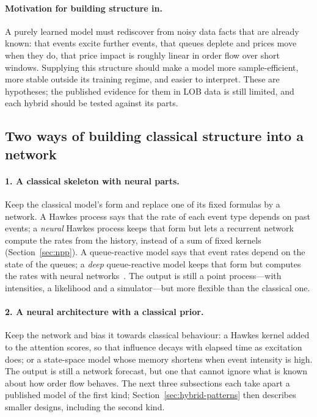 \paragraph{Motivation for building structure in.} A purely learned model must rediscover from noisy
data facts that are already known: that events excite further events, that queues deplete and prices move
when they do, that price impact is roughly linear in order flow over short windows. Supplying this structure
should make a model more sample-efficient, more stable outside its training regime, and easier to interpret.
These are hypotheses; the published evidence for them in LOB data is still limited, and each hybrid should be
tested against its parts.

\subsection{Two ways of building classical structure into a network}
\label{sec:hybrid-ways}

\paragraph{1. A classical skeleton with neural parts.} Keep the classical model's form and replace one of its
fixed formulas by a network. A Hawkes process says that the rate of each event type depends on past events; a
\emph{neural} Hawkes process keeps that form but lets a recurrent network compute the rates from the history,
instead of a sum of fixed kernels (Section~\ref{sec:npp}). A queue-reactive model says that event rates depend
on the state of the queues; a \emph{deep} queue-reactive model keeps that form but computes the rates with
neural networks~\citep{deepqr}. The output is still a point process---with intensities, a likelihood and a
simulator---but more flexible than the classical one.

\paragraph{2. A neural architecture with a classical prior.} Keep the network and bias it towards classical
behaviour: a Hawkes kernel added to the attention scores, so that influence decays with elapsed time as
excitation does; or a state-space model whose memory shortens when event intensity is high. The output is
still a network forecast, but one that cannot ignore what is known about how order flow behaves. The
next three subsections each take apart a published model of the first kind; Section~\ref{sec:hybrid-patterns}
then describes smaller designs, including the second kind.

